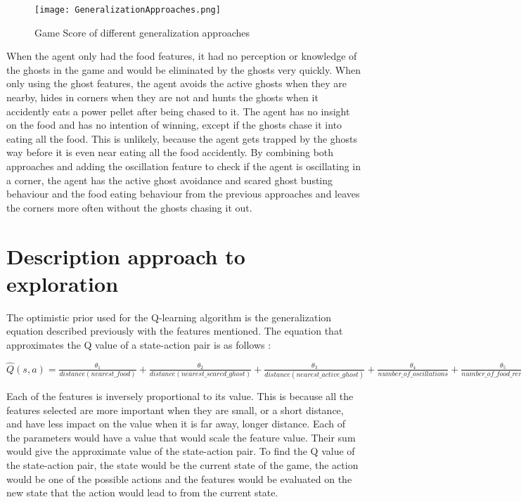 \documentclass[11pt]{scrartcl}
\begin{document}
\begin{figure}[ht]
\centering	
\texttt{[image: GeneralizationApproaches.png]}	
\caption{Game Score of different generalization approaches}
\label{fig:F1}
\end{figure}

When the agent only had the food features, it had no perception or knowledge of the ghosts in the game and would be eliminated by the ghosts very quickly. When only using the ghost features, the agent avoids the active ghosts when they are nearby, hides in corners when they are not and hunts the ghosts when it accidently eats a power pellet after being chased to it. The agent has no insight on the food and has no intention of winning, except if the ghosts chase it into eating all the food. This is unlikely, because the agent gets trapped by the ghosts way before it is even near eating all the food accidently. By combining both approaches and adding the oscillation feature to check if the agent is oscillating in a corner, the agent has the active ghost avoidance and scared ghost busting behaviour and the food eating behaviour from the previous approaches and leaves the corners more often without the ghosts chasing it out.

\section{Description approach to exploration}

The optimistic prior used for the Q-learning algorithm is the generalization equation described previously with the features mentioned. The equation that approximates the Q value of a state-action pair is as follows : 

\begin{center}
$\hat{Q}(s,a) = \frac{\theta_1}{distance(nearest\_food)} + \frac{\theta_2}{distance(nearest\_scared\_ghost)} + \frac{\theta_3}{distance(nearest\_active\_ghost)} + \frac{\theta_4}{number\_of\_oscillations} + \frac{\theta_5}{number\_of\_food\_remaining}$
\end{center}

Each of the features is inversely proportional to its value. This is because all the features selected are more important when they are small, or a short distance, and have less impact on the value when it is far away, longer distance. Each of the parameters would have a value that would scale the feature value. Their sum would give the approximate value of the state-action pair. To find the Q value of the state-action pair, the state would be the current state of the game, the action would be one of the possible actions and the features would be evaluated on the new state that the action would lead to from the current state. 
\end{document}
